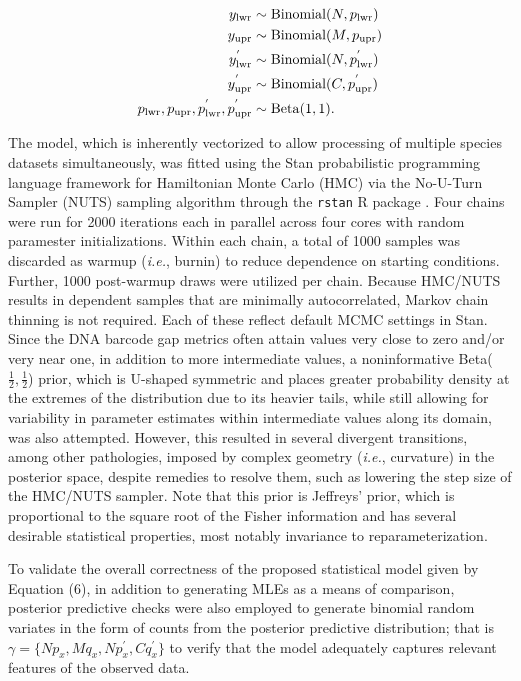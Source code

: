 \documentclass[12pt]{article}
\begin{document}
\begin{align}
\notag y_\mathrm{lwr} &\sim \mathrm{Binomial}(N, p_\mathrm{lwr}) \\ 
\notag y_\mathrm{upr} &\sim \mathrm{Binomial}(M, p_\mathrm{upr}) \\ 
y^{'}_\mathrm{lwr} &\sim \mathrm{Binomial}(N, p^{'}_\mathrm{lwr}) \\ 
 \notag y^{'}_\mathrm{upr} &\sim \mathrm{Binomial}(C, p^{'}_\mathrm{upr}) \\ 
\notag p_\mathrm{lwr}, p_\mathrm{upr}, p^{'}_\mathrm{lwr}, p^{'}_\mathrm{upr}
&\sim \mathrm{Beta}(1, 1).
\end{align}

The model, which is inherently vectorized to allow processing of multiple species datasets simultaneously, was fitted using the Stan probabilistic programming language  \citep{carpenter2017stan} framework for Hamiltonian Monte Carlo (HMC) via the No-U-Turn Sampler (NUTS) sampling algorithm \citep{hoffman2014no} through the {\tt rstan} R package \citep{stan2023rstan}. Four chains were run for 2000 iterations each in parallel across four cores with random paramester initializations. Within each chain, a total of 1000 samples was discarded as warmup (\textit{i.e.}, burnin) to reduce dependence on starting conditions. Further, 1000 post-warmup draws were utilized per chain. Because HMC/NUTS results in dependent samples that are minimally autocorrelated, Markov chain thinning is not required. Each of these reflect default MCMC settings in Stan. Since the DNA barcode gap metrics often attain values very close to zero and/or very near one, in addition to more intermediate values, a noninformative Beta($\frac{1}{2}, \frac{1}{2}$) prior, which is U-shaped symmetric and places greater probability density at the extremes of the distribution due to its heavier tails, while still allowing for variability in parameter estimates within intermediate values along its domain, was also attempted. However, this resulted in several divergent transitions, among other pathologies, imposed by complex geometry (\textit{i.e.}, curvature) in the posterior space, despite remedies to resolve them, such as lowering the step size of the HMC/NUTS sampler. Note that this prior is Jeffreys' prior, which is proportional to the square root of the Fisher information and has several desirable statistical properties, most notably invariance to reparameterization. 

To validate the overall correctness of the proposed statistical model given by \\ Equation (6), in addition to generating MLEs as a means of comparison, posterior predictive checks were also employed to generate binomial random variates in the form of counts from the posterior predictive distribution; that is $\gamma = \{Np_x, Mq_x, Np^{'}_x, Cq^{'}_x\}$ to verify that the model adequately captures relevant features of the observed data.
\end{document}
